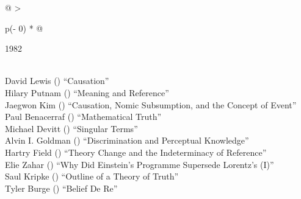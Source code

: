 \documentclass[
  10pt,
  letterpaper,
  DIV=11,
  numbers=noendperiod,
  twoside]{scrartcl}
\begin{document}
\begin{longtable}[]{@{}
  >{\raggedright\arraybackslash}p{(\columnwidth - 0\tabcolsep) * }@{}}

\caption{\label{tbl-top-ten-1973}Most cited articles published less than
ten years ago as of 1982.}

\tabularnewline

\toprule\noalign{}
\begin{minipage}[b]{\linewidth}\raggedright
1982
\end{minipage} \\
\midrule\noalign{}
\endhead
\bottomrule\noalign{}
\endlastfoot
David Lewis
()
``Causation'' \\
Hilary Putnam
()
``Meaning and Reference'' \\
Jaegwon Kim
()
``Causation, Nomic Subsumption, and the Concept of Event'' \\
Paul Benacerraf
()
``Mathematical Truth'' \\
Michael Devitt
()
``Singular Terms'' \\
Alvin I. Goldman
()
``Discrimination and Perceptual Knowledge'' \\
Hartry Field
()
``Theory Change and the Indeterminacy of Reference'' \\
Elie Zahar
()
``Why Did Einstein's Programme Supersede Lorentz's (I)'' \\
Saul Kripke
()
``Outline of a Theory of Truth'' \\
Tyler Burge
()
``Belief De Re'' \\

\end{longtable}
\end{document}
